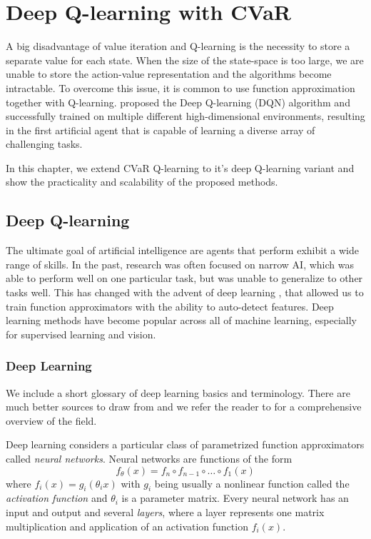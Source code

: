 \chapter{Deep Q-learning with CVaR}\label{ch:dqn}

A big disadvantage of value iteration and Q-learning is the necessity to store a separate value for each state. When the size of the state-space is too large, we are unable to store the action-value representation and the algorithms become intractable. To overcome this issue, it is common to use function approximation together with Q-learning. \citet{mnih2015human} proposed the Deep Q-learning (DQN) algorithm and successfully trained on multiple different high-dimensional environments, resulting in the first artificial agent that is capable of learning a diverse array of challenging tasks.

In this chapter, we extend CVaR Q-learning to it's deep Q-learning variant and show the practicality and scalability of the proposed methods.

\section{Deep Q-learning}
The ultimate goal of artificial intelligence are agents that perform exhibit a wide range of skills. In the past, research was often focused on narrow AI, which was able to perform well on one particular task, but was unable to generalize to other tasks well. This has changed with the advent of deep learning \citep{krizhevsky2012imagenet}, that allowed us to train function approximators with the ability to auto-detect features. Deep learning methods have become popular across all of machine learning, especially for supervised learning and vision.

\subsection{Deep Learning}

We include a short glossary of deep learning basics and terminology. There are much better sources to draw from and we refer the reader to \citet{goodfellow2016deep} for a comprehensive overview of the field.

Deep learning considers a particular class of parametrized function approximators called \textit{neural networks}. 
Neural networks are functions of the form $$f_\theta(x) = f_n \circ f_{n-1} \circ\hdots\circ  f_1(x)$$ where $f_i(x) = g_i(\theta_i x)$ with $g_i$ being usually a nonlinear function called the \textit{activation function} and $\theta_i$ is a parameter matrix. Every neural network has an input and output and several \textit{layers}, where a layer represents one matrix multiplication and application of an activation function $f_i(x)$.

